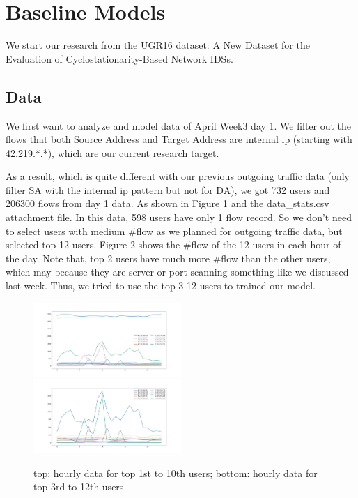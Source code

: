 \documentclass{article}
\begin{document}
\section{Baseline Models}

We start our research from the UGR16 dataset: A New Dataset for the Evaluation of Cyclostationarity-Based Network IDSs.

\subsection{Data}
We first want to analyze and model data of April Week3 day 1. We filter out the flows that both Source Address and Target Address are internal ip (starting with 42.219.*.*), which are our current research target.

As a result, which is quite different with our previous outgoing traffic data (only filter SA with the internal ip pattern but not for DA), we got 732 users and 206300 flows from day 1 data. As shown in Figure 1 and the data\_stats.csv attachment file. In this data, 598 users have only 1 flow record. So we don't need to select users with medium \#flow as we planned for outgoing traffic data, but selected top 12 users. Figure 2 shows the \#flow of the 12 users in each hour of the day. Note that, top 2 users have much more \#flow than the other users, which may because they are server or port scanning something like we discussed last week. Thus, we tried to use the top 3-12 users to trained our model.

\begin{figure}[h]
\centering
\includegraphics[width=0.5\textwidth]{figures/top1to10rawdatahourly.pdf}
\includegraphics[width=0.5\textwidth]{figures/top3to12rawdatahourly.pdf}
\caption{top: hourly data for top 1st to 10th users; bottom: hourly data for top 3rd to 12th users}
\label{fig:hourly}
\end{figure}
\end{document}

